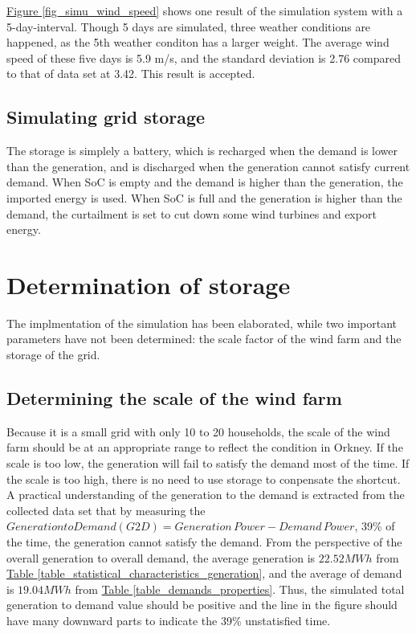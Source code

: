 \documentclass[12pt,a4paper]{report}
\begin{document}
                \hyperref[fig_simu_wind_speed]{Figure \ref*{fig_simu_wind_speed}} shows one result of the simulation system with a 5-day-interval. Though 5 days are simulated, three weather conditions are happened, as the 5th weather conditon has a larger weight. The average wind speed of these five days is 5.9 m/s, and the standard deviation is 2.76 compared to that of data set at 3.42. This result is accepted.

                \subsection{Simulating grid storage}
                The storage is simplely a battery, which is recharged when the demand is lower than the generation, and is discharged when the generation cannot satisfy current demand. When SoC is empty and the demand is higher than the generation, the imported energy is used. When SoC is full and the generation is higher than the demand, the curtailment is set to cut down some wind turbines and export energy.

            \section{Determination of storage}
            The implmentation of the simulation has been elaborated, while two important parameters have not been determined: the scale factor of the wind farm and the storage of the grid. 

            \subsection{Determining the scale of the wind farm}
            Because it is a small grid with only 10 to 20 households, the scale of the wind farm should be at an appropriate range to reflect the condition in Orkney. If the scale is too low, the generation will fail to satisfy the demand most of the time. If the scale is too high, there is no need to use storage to conpensate the shortcut. A practical understanding of the generation to the demand is extracted from the collected data set that by measuring the $Generation to Demand (G2D) = Generation\, Power - Demand\, Power $, 39\% of the time, the generation cannot satisfy the demand. From the perspective of the overall generation to overall demand, the average generation is $22.52 MWh$ from \hyperref[table_statistical_characteristics_generation]{Table \ref*{table_statistical_characteristics_generation}}, and the average of demand is $19.04 MWh$ from \hyperref[table_demands_properties]{Table \ref*{table_demands_properties}}. Thus, the simulated total generation to demand value should be positive and the line in the figure should have many downward parts to indicate the 39\% unstatisfied time.
\end{document}

